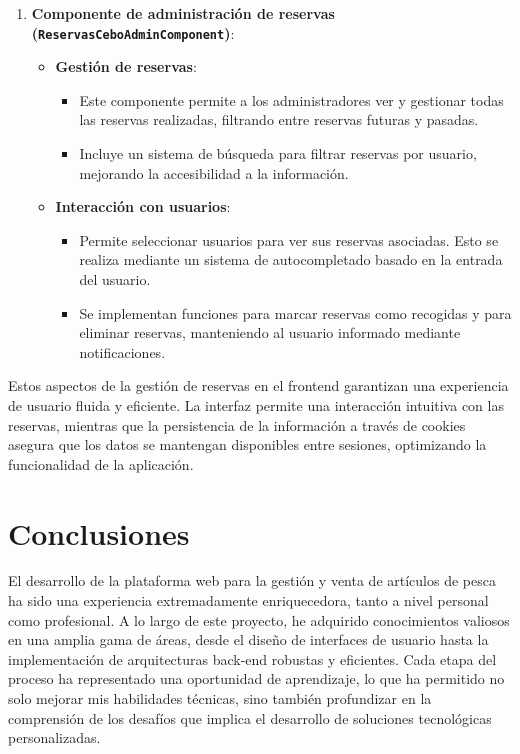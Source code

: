 \begin{itemize}
\begin{enumerate}
    \item \textbf{Componente de administración de reservas (\texttt{ReservasCeboAdminComponent})}:
    \begin{itemize}
        \item \textbf{Gestión de reservas}:
        \begin{itemize}
            \item Este componente permite a los administradores ver y gestionar todas las reservas realizadas, filtrando entre reservas futuras y pasadas.
            \item Incluye un sistema de búsqueda para filtrar reservas por usuario, mejorando la accesibilidad a la información.
        \end{itemize}
        
        \item \textbf{Interacción con usuarios}:
        \begin{itemize}
            \item Permite seleccionar usuarios para ver sus reservas asociadas. Esto se realiza mediante un sistema de autocompletado basado en la entrada del usuario.
            \item Se implementan funciones para marcar reservas como recogidas y para eliminar reservas, manteniendo al usuario informado mediante notificaciones.
        \end{itemize}
    \end{itemize}
\end{enumerate}

Estos aspectos de la gestión de reservas en el frontend garantizan una experiencia de usuario fluida y eficiente. La interfaz permite una interacción intuitiva con las reservas, mientras que la persistencia de la información a través de cookies asegura que los datos se mantengan disponibles entre sesiones, optimizando la funcionalidad de la aplicación.

\end{itemize}




\chapter{Conclusiones}\label{cap:cap6}

El desarrollo de la plataforma web para la gestión y venta de artículos de pesca ha sido una experiencia extremadamente enriquecedora, tanto a nivel personal como profesional. A lo largo de este proyecto, he adquirido conocimientos valiosos en una amplia gama de áreas, desde el diseño de interfaces de usuario hasta la implementación de arquitecturas back-end robustas y eficientes. Cada etapa del proceso ha representado una oportunidad de aprendizaje, lo que ha permitido no solo mejorar mis habilidades técnicas, sino también profundizar en la comprensión de los desafíos que implica el desarrollo de soluciones tecnológicas personalizadas.

